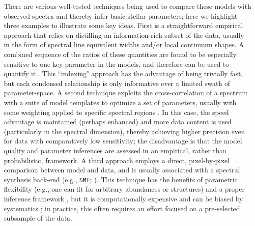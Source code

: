 \documentclass[iop,floatfix,numberedappendix,twocolappendix]{emulateapj}
\begin{document}
There are various well-tested techniques being used to compare these models with observed spectra 
and thereby infer basic stellar parameters; here we highlight three examples to illustrate some key 
ideas.  First is a straightforward empirical approach that relies on distilling an information-rich 
subset of the data, usually in the form of spectral line equivalent widths and/or local continuum 
shapes.  A combined sequence of the ratios of these quantities are found to be especially sensitive 
to one key parameter in the models, and therefore can be used to quantify it \citep[e.g., {\tt 
MOOG};][]{sneden73,gray94,reid95,rojas-ayala10,rojas-ayala12}.  This ``indexing" approach has the 
advantage of being trivially fast, but each condensed relationship is only informative over a 
limited swath of parameter-space.  A second technique exploits the cross-correlation of a spectrum 
with a suite of model templates to optimize a set of parameters, usually with some weighting 
applied to specific spectral regions \citep[e.g., {\tt SPC};][]{buchhave12}.  In this case, the 
speed advantage is maintained (perhaps enhanced) and more data content is used (particularly in the 
spectral dimension), thereby achieving higher precision even for data with comparatively low 
sensitivity; the disadvantage is that the model quality and parameter inferences are assessed in an 
empirical, rather than probabilistic, framework.  A third approach employs a direct, pixel-by-pixel 
comparison between model and data, and is usually associated with a spectral synthesis back-end 
(e.g., {\tt SME}; \citealt{valenti96}).  This technique has the benefits of parametric flexibility 
(e.g., one can fit for arbitrary abundances or structures) and a proper inference framework 
\citep[usually a least-squares approach, although increasingly in a Bayesian format;][]{shkedy07,
schoenrich13}, but it is computationally expensive and can be biased by systematics 
\citep[e.g.,][]{mann13}; in practice, this often requires an effort focused on a pre-selected 
subsample of the data. 
\end{document}
